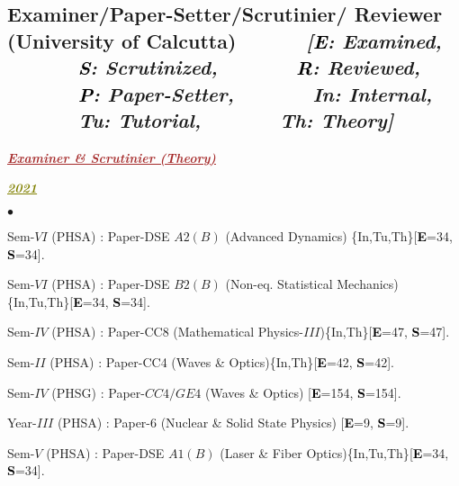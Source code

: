 \documentclass[margin,line]{res}
\newenvironment{list1}{
  \begin{list}{\ding{113}}{%
      \setlength{\itemsep}{0in}
      \setlength{\parsep}{0in} \setlength{\parskip}{0in}
      \setlength{\topsep}{0in} \setlength{\partopsep}{0in} 
      \setlength{\leftmargin}{0.17in}}}{\end{list}}
\newenvironment{list2}{
  \begin{list}{$\bullet$}{%
      \setlength{\itemsep}{0in}
      \setlength{\parsep}{0in} \setlength{\parskip}{0in}
      \setlength{\topsep}{0in} \setlength{\partopsep}{0in} 
      \setlength{\leftmargin}{0.2in}}}{\end{list}}
\begin{document}
\begin{resume}
\section{\sc Examiner/Paper-Setter/Scrutinier/ Reviewer (University of Calcutta) $\;\;\;\;\;\;\;\;\;\;\;\;${\it [\textcolor{black}{\bf E}: Examined, $\;\;\;\;\;\;\;\;\;\;\;\;$ \textcolor{black}{\bf S}: Scrutinized, $\;\;\;\;\;\;\;\;\;\;\;\;$ \textcolor{black}{\bf R}: Reviewed, $\;\;\;\;\;\;\;\;\;\;\;\;$ \textcolor{black}{\bf P}: Paper-Setter, $\;\;\;\;\;\;\;\;\;\;\;\;$ \textcolor{alizarin}{\bf In}: Internal, $\;\;\;\;\;\;\;\;\;\;\;\;$ \textcolor{alizarin}{\bf Tu}: Tutorial, $\;\;\;\;\;\;\;\;\;\;\;\;$ \textcolor{alizarin}{\bf Th}: Theory]}}
\begin{list1}
\item[] \textcolor{brown}{\underline{\textbf{\textit{Examiner \& Scrutinier (Theory)}}}}
\vspace{1mm}
\end{list1}
\begin{list1}
\item[] \textcolor{olive}{\underline{\textbf{\textit{2021}}}}
\vspace{1mm}
\end{list1}
\begin{list2}
\item Sem-$VI$ (PHSA) : Paper-DSE $A2(B)$ (Advanced Dynamics) \textcolor{alizarin}{\{In,Tu,Th\}}[\textcolor{black}{\bf E}=34, 
      \textcolor{black}{\bf S}=34].
\item Sem-$VI$ (PHSA) : Paper-DSE $B2(B)$ (Non-eq. Statistical Mechanics)\textcolor{alizarin}{\{In,Tu,Th\}}[\textcolor{black}{\bf E}=34, 
      \textcolor{black}{\bf S}=34].
\item Sem-$IV$ (PHSA) : Paper-CC8 (Mathematical Physics-$III$)\textcolor{alizarin}{\{In,Th\}}[\textcolor{black}{\bf E}=47, \textcolor{black}{\bf S}=47]. 
\item Sem-$II$ (PHSA) : Paper-CC4 (Waves \& Optics)\textcolor{alizarin}{\{In,Th\}}[\textcolor{black}{\bf E}=42, \textcolor{black}{\bf S}=42]. 
\item Sem-$IV$ (PHSG) : Paper-$CC4/GE4$ (Waves \& Optics) [\textcolor{black}{\bf E}=154, \textcolor{black}{\bf S}=154]. 
\item Year-$III$ (PHSA) : Paper-6 (Nuclear \& Solid State Physics) [\textcolor{black}{\bf E}=9, \textcolor{black}{\bf S}=9]. 
\item Sem-$V$ (PHSA) : Paper-DSE $A1(B)$ (Laser \& Fiber Optics)\textcolor{alizarin}{\{In,Tu,Th\}}[\textcolor{black}{\bf E}=34, \textcolor{black}{\bf S}=34]. 

\end{list2}
\end{resume}
\end{document}
